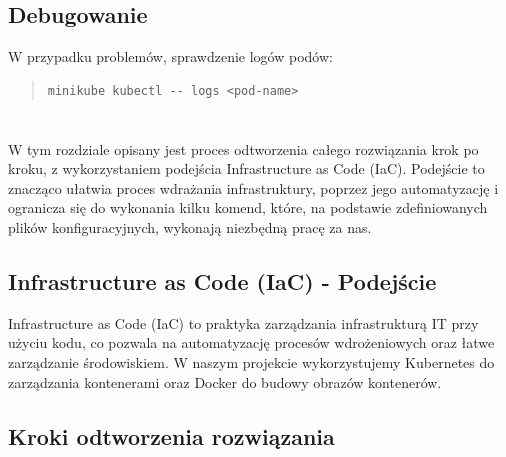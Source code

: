 \documentclass[polish]{aghengthesis}
\begin{document}
\section{Debugowanie}

W przypadku problemów, sprawdzenie logów podów:
\begin{quote}
\begin{lstlisting}[basicstyle=\ttfamily, numbers=none]
minikube kubectl -- logs <pod-name>
\end{lstlisting}
\end{quote}

\chapter{\ChapterTitleSolutionSteps}
\label{sec:odtworzenie}

W tym rozdziale opisany jest proces odtworzenia całego rozwiązania krok po kroku, z wykorzystaniem podejścia Infrastructure as Code (IaC). Podejście to znacząco ułatwia proces wdrażania infrastruktury, poprzez jego automatyzację i ogranicza się do wykonania kilku komend, które, na podstawie zdefiniowanych plików konfiguracyjnych, wykonają niezbędną pracę za nas.

\section{Infrastructure as Code (IaC) - Podejście}

Infrastructure as Code (IaC) to praktyka zarządzania infrastrukturą IT przy użyciu kodu, co pozwala na automatyzację procesów wdrożeniowych oraz łatwe zarządzanie środowiskiem. W naszym projekcie wykorzystujemy Kubernetes do zarządzania kontenerami oraz Docker do budowy obrazów kontenerów.

\section{Kroki odtworzenia rozwiązania}
\end{document}
